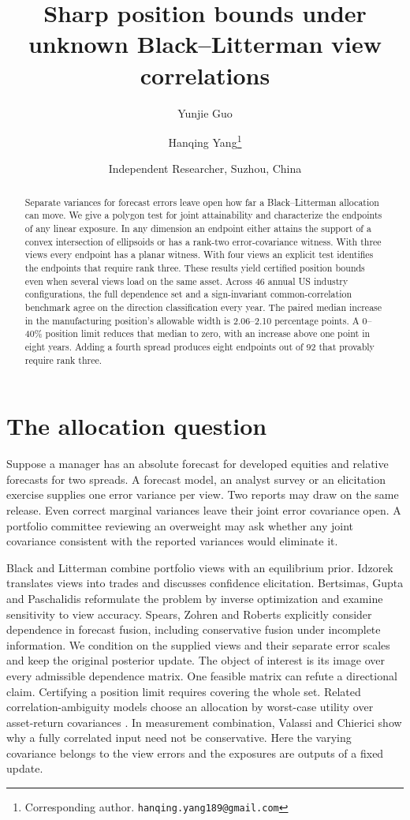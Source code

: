 \documentclass[11pt]{article}
\title{Sharp position bounds under unknown Black--Litterman view correlations}
\author{Yunjie Guo \and Hanqing Yang\thanks{Corresponding author. \texttt{hanqing.yang189@gmail.com}}}
\date{Independent Researcher, Suzhou, China}
\begin{document}
\maketitle
\begin{abstract}
Separate variances for forecast errors leave open how far a Black--Litterman allocation can move. We give a polygon test for joint attainability and characterize the endpoints of any linear exposure. In any dimension an endpoint either attains the support of a convex intersection of ellipsoids or has a rank-two error-covariance witness. With three views every endpoint has a planar witness. With four views an explicit test identifies the endpoints that require rank three. These results yield certified position bounds even when several views load on the same asset. Across 46 annual US industry configurations, the full dependence set and a sign-invariant common-correlation benchmark agree on the direction classification every year. The paired median increase in the manufacturing position's allowable width is 2.06--2.10 percentage points. A 0--40\% position limit reduces that median to zero, with an increase above one point in eight years. Adding a fourth spread produces eight endpoints out of 92 that provably require rank three.
\end{abstract}

\section{The allocation question}
Suppose a manager has an absolute forecast for developed equities and relative forecasts for two spreads. A forecast model, an analyst survey or an elicitation exercise supplies one error variance per view. Two reports may draw on the same release. Even correct marginal variances leave their joint error covariance open. A portfolio committee reviewing an overweight may ask whether any joint covariance consistent with the reported variances would eliminate it.

Black and Litterman \cite{bl} combine portfolio views with an equilibrium prior. Idzorek \cite{idz} translates views into trades and discusses confidence elicitation. Bertsimas, Gupta and Paschalidis \cite{io} reformulate the problem by inverse optimization and examine sensitivity to view accuracy. Spears, Zohren and Roberts \cite{fusion} explicitly consider dependence in forecast fusion, including conservative fusion under incomplete information. We condition on the supplied views and their separate error scales and keep the original posterior update. The object of interest is its image over every admissible dependence matrix. One feasible matrix can refute a directional claim. Certifying a position limit requires covering the whole set. Related correlation-ambiguity models choose an allocation by worst-case utility over asset-return covariances \cite{jiang}. In measurement combination, Valassi and Chierici \cite{blue} show why a fully correlated input need not be conservative. Here the varying covariance belongs to the view errors and the exposures are outputs of a fixed update.
\end{document}
